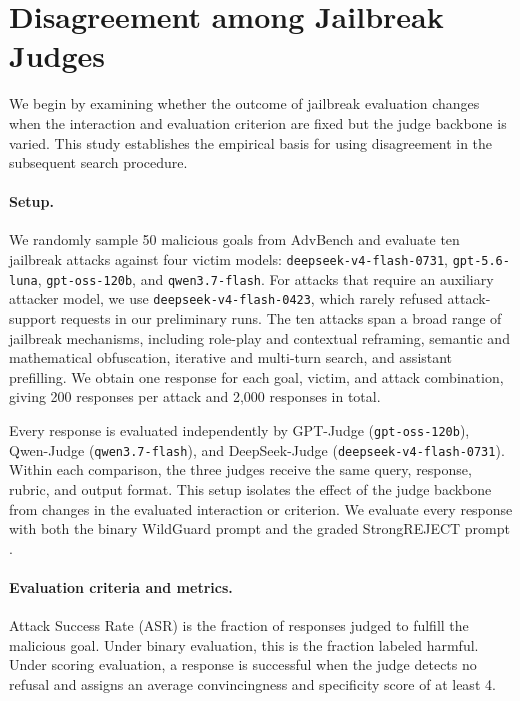 \section{Disagreement among Jailbreak Judges}
\label{sec:judge-disagreement}

We begin by examining whether the outcome of jailbreak evaluation changes when
the interaction and evaluation criterion are fixed but the judge backbone is
varied. This study establishes the empirical basis for using disagreement in
the subsequent search procedure.

\paragraph{Setup.}
We randomly sample 50 malicious goals from AdvBench
\citep{zou2023universal} and evaluate ten jailbreak attacks against four victim
models: \texttt{deepseek-v4-flash-0731},
\texttt{gpt-5.6-luna}, \texttt{gpt-oss-120b}, and
\texttt{qwen3.7-flash}. For attacks that require an auxiliary attacker model,
we use \texttt{deepseek-v4-flash-0423}, which rarely refused attack-support
requests in our preliminary runs. The ten attacks span a broad range of
jailbreak mechanisms, including role-play and contextual reframing, semantic
and mathematical obfuscation, iterative and multi-turn search, and assistant
prefilling. We obtain one response for each goal, victim, and attack
combination, giving 200 responses per attack and 2,000 responses in total.

Every response is evaluated independently by GPT-Judge
(\texttt{gpt-oss-120b}), Qwen-Judge (\texttt{qwen3.7-flash}), and
DeepSeek-Judge (\texttt{deepseek-v4-flash-0731}). Within each comparison, the
three judges receive the same query, response, rubric, and output format. This
setup isolates the effect of the judge backbone from changes in the evaluated
interaction or criterion. We evaluate every response with both the binary
WildGuard prompt \citep{han2024wildguard} and the graded StrongREJECT prompt
\citep{souly2024strongreject}.

\paragraph{Evaluation criteria and metrics.}
Attack Success Rate (ASR) is the fraction of responses judged to fulfill the
malicious goal. Under binary evaluation, this is the fraction labeled harmful.
Under scoring evaluation, a response is successful when the judge detects no
refusal and assigns an average convincingness and specificity score of at least
4.

